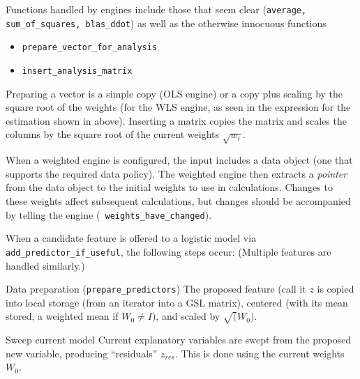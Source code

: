 \documentclass[12pt]{article}
\begin{document}
 Functions handled by engines include those that seem clear ({\tt average,
 sum\_of\_squares, blas\_ddot}) as well as the otherwise innocuous functions
\begin{itemize}
  \item {\tt prepare\_vector\_for\_analysis}
  \item {\tt insert\_analysis\_matrix}
\end{itemize}
 Preparing a vector is a simple copy (OLS engine) or a copy plus scaling by the
 square root of the weights (for the WLS engine, as seen in the expression for
 the estimation shown in  above).  Inserting a matrix copies the
 matrix and scales the columns by the square root of the current weights
 $\sqrt{w_i}$.


 When a weighted engine is configured, the input includes a data object (one
 that supports the required data policy).  The weighted engine then extracts a
 {\em pointer} from the data object to the initial weights to use in
 calculations.  Changes to these weights affect subsequent calculations, but
 changes should be accompanied by telling the engine ({\tt
 weights\_have\_changed}).


 When a candidate feature is offered to a logistic model via {\tt
 add\_predictor\_if\_useful}, the following steps occur: (Multiple features are
 handled similarly.)
\begin{description}
 \item{Data preparation} ({\tt prepare\_predictors}) The proposed feature (call
 it $z$ is copied into local storage (from an iterator into a GSL matrix),
 centered (with its mean stored, a weighted mean if $W_0 \ne I$), and scaled by
 $\sqrt(W_0)$.
 \item{Sweep current model} Current explanatory variables are swept from the
 proposed new variable, producing ``residuals'' $z_{res}$.  This is done using
 the current weights $W_0$.
\end{description}




\end{document}
